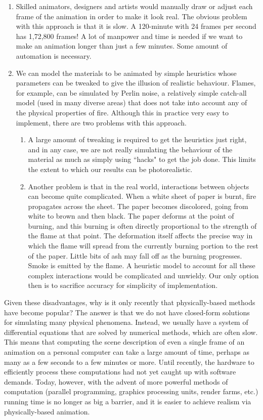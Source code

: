 \documentclass[a4paper]{report}
\begin{document}
\begin{enumerate}
  \item Skilled animators, designers and artists would manually draw or adjust each frame of the animation in order to make it look real. The obvious problem with this approach is that it is slow. A 120-minute with 24 frames per second has 1,72,800 frames! A lot of manpower and time is needed if we want to make an animation longer than just a few minutes. Some amount of automation is necessary.
  \item We can model the materials to be animated by simple heuristics whose parameters can be tweaked to give the illusion of realistic behaviour. Flames, for example, can be simulated by Perlin noise, a relatively simple catch-all model (used in many diverse areas) that does not take into account any of the physical properties of fire. Although this in practice very easy to implement, there are two problems with this approach.
  \begin{enumerate}
    \item A large amount of tweaking is required to get the heuristics just right, and in any case, we are not really simulating the behaviour of the material as much as simply using ``hacks" to get the job done. This limits the extent to which our results can be photorealistic.
    \item Another problem is that in the real world, interactions between objects can become quite complicated. When a white sheet of paper is burnt, fire propagates across the sheet. The paper becomes discolored, going from white to brown and then black. The paper deforms at the point of burning, and this burning is often directly proportional to the strength of the flame at that point. The deformation itself affects the precise way in which the flame will spread from the currently burning portion to the rest of the paper. Little bits of ash may fall off as the burning progresses. Smoke is emitted by the flame. A heuristic model to account for all these complex interactions would be complicated and unwieldy. Our only option then is to sacrifice accuracy for simplicity of implementation.
  \end{enumerate}
\end{enumerate}

Given these disadvantages, why is it only recently that physically-based methods have become popular? The answer is that we do not have closed-form solutions for simulating many physical phenomena. Instead, we usually have a system of differential equations that are solved by numerical methods, which are often slow. This means that computing the scene description of even a single frame of an animation on a personal computer can take a large amount of time, perhaps as many as a few seconds to a few minutes or more. Until recently, the hardware to efficiently process these computations had not yet caught up with software demands. Today, however, with the advent of more powerful methods of computation (parallel programming, graphics processing units, render farms, etc.) running time is no longer as big a barrier, and it is easier to achieve realism via physically-based animation.
\end{document}
